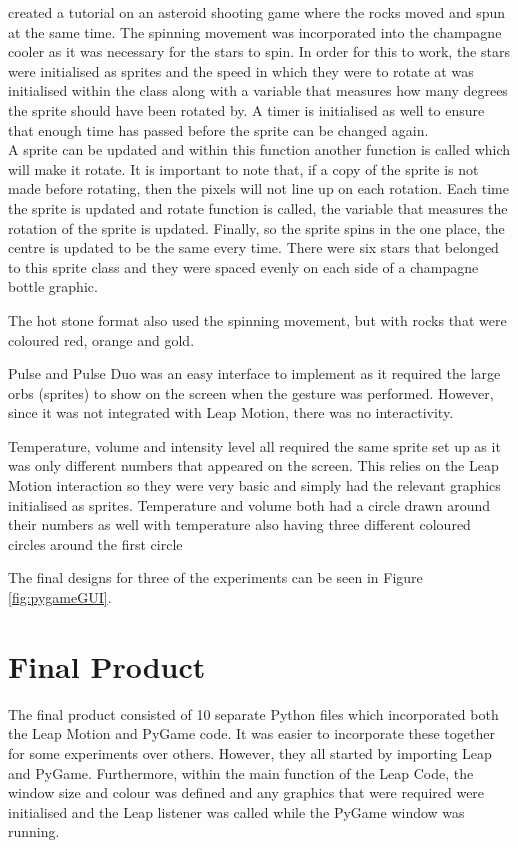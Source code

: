 \documentclass{l4proj}
\begin{document}
\cite{Bradfield_2016} created a tutorial on an asteroid shooting game where the rocks moved and spun at the same time. The spinning movement was incorporated into the champagne cooler as it was necessary for the stars to spin. In order for this to work, the stars were initialised as sprites and the speed in which they were to rotate at was initialised within the class along with a variable that measures how many degrees the sprite should have been rotated by. A timer is initialised as well to ensure that enough time has passed before the sprite can be changed again.\\
A sprite can be updated and within this function another function is called which will make it rotate. It is important to note that, if a copy of the sprite is not made before rotating, then the pixels will not line up on each rotation. Each time the sprite is updated and rotate function is called, the variable that measures the rotation of the sprite is updated. Finally, so the sprite spins in the one place, the centre is updated to be the same every time. There were six stars that belonged to this sprite class and they were spaced evenly on each side of a champagne bottle graphic.

The hot stone format also used the spinning movement, but with rocks that were coloured red, orange and gold.

Pulse and Pulse Duo was an easy interface to implement as it required the large orbs (sprites) to show on the screen when the gesture was performed. However, since it was not integrated with Leap Motion, there was no interactivity.

Temperature, volume and intensity level all required the same sprite set up as it was only different numbers that appeared on the screen. This relies on the Leap Motion interaction so they were very basic and simply had the relevant graphics initialised as sprites. Temperature and volume both had a circle drawn around their numbers as well with temperature also having three different coloured circles around the first circle

The final designs for three of the experiments can be seen in Figure \ref{fig:pygameGUI}.
\section{Final Product}
The final product consisted of 10 separate Python files which incorporated both the Leap Motion and PyGame code. It was easier to incorporate these together for some experiments over others. However, they all started by importing Leap and PyGame. Furthermore, within the main function of the Leap Code, the window size and colour was defined and any graphics that were required were initialised and the Leap listener was called while the PyGame window was running.
\end{document}
